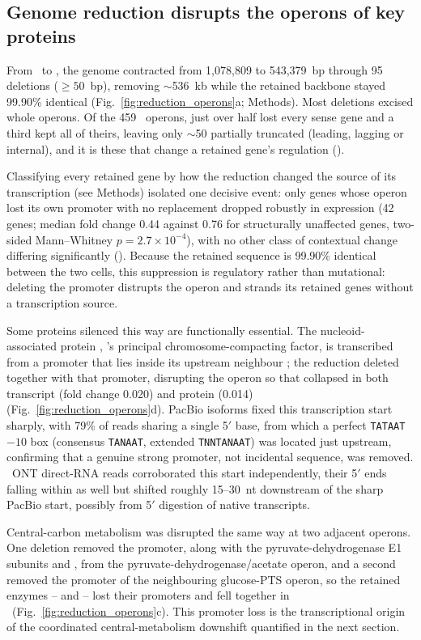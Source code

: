 \subsection{Genome reduction disrupts the operons of key proteins}

From \syn~to \syna, the genome contracted from 1{,}078{,}809 to 543{,}379~bp through 95 deletions ($\geq 50$~bp), removing $\sim$536~kb while the retained backbone stayed 99.90\% identical (Fig.~\ref{fig:reduction_operons}a; Methods).
Most deletions excised whole operons. Of the 459 \syn~operons, just over half lost every sense gene and a third kept all of theirs, leaving only $\sim$50 partially truncated (leading, lagging or internal), and it is these that change a retained gene's regulation (\sdreduction).

Classifying every retained gene by how the reduction changed the source of its transcription (see Methods) isolated one decisive event: only genes whose operon lost its own promoter with no replacement dropped robustly in expression (42 genes; median fold change 0.44 against 0.76 for structurally unaffected genes, two-sided Mann--Whitney $p = 2.7\times10^{-4}$), with no other class of contextual change differing significantly (\sdreduction).
Because the retained sequence is 99.90\% identical between the two cells, this suppression is regulatory rather than mutational: deleting the promoter distrupts the operon and strands its retained genes without a transcription source.

Some proteins silenced this way are functionally essential.
The nucleoid-associated protein , \syn's principal chromosome-compacting factor, is transcribed from a promoter that lies inside its upstream neighbour ; the reduction deleted  together with that promoter, disrupting the operon so that  collapsed in both transcript (fold change 0.020) and protein (0.014) (Fig.~\ref{fig:reduction_operons}d).
PacBio isoforms fixed this transcription start sharply, with 79\% of reads sharing a single 5$'$ base, from which a perfect \texttt{TATAAT} $-10$ box (consensus \texttt{TANAAT}, extended \texttt{TNNTANAAT}) was located just upstream, confirming that a genuine strong promoter, not incidental sequence, was removed.
\syn~ONT direct-RNA reads corroborated this start independently, their 5$'$ ends falling within  as well but shifted roughly 15--30~nt downstream of the sharp PacBio start, possibly from 5$'$ digestion of native transcripts.

Central-carbon metabolism was disrupted the same way at two adjacent operons.
One deletion removed the promoter, along with the pyruvate-dehydrogenase E1 subunits  and , from the pyruvate-dehydrogenase/acetate operon, and a second removed the promoter of the neighbouring glucose-PTS operon, so the retained enzymes -- and -- lost their promoters and fell together in \syna~(Fig.~\ref{fig:reduction_operons}c).
This promoter loss is the transcriptional origin of the coordinated central-metabolism downshift quantified in the next section.

